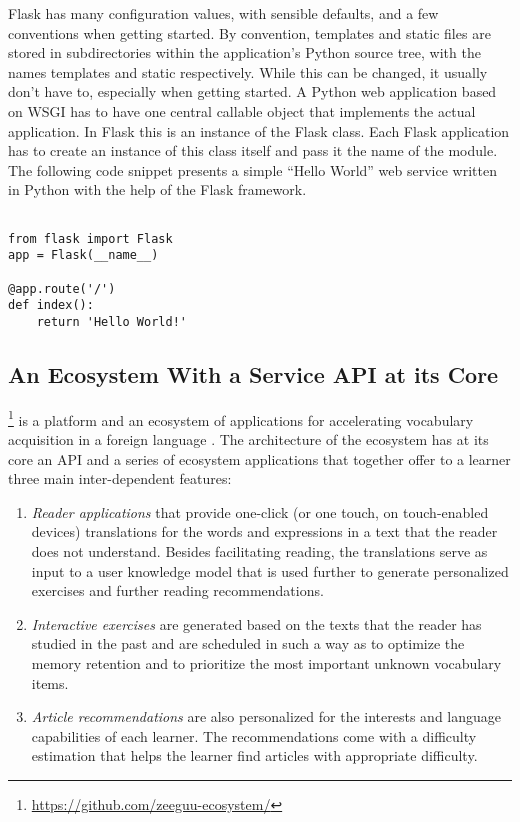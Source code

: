  Flask has many configuration values, with sensible defaults, and a few conventions when getting started. By convention, templates and static files are stored in subdirectories within the application's Python source tree, with the names templates and static respectively. While this can be changed, it usually don’t have to, especially when getting started.
%
 A Python web application based on WSGI has to have one central callable object that implements the actual application. In Flask this is an instance of the Flask class. Each Flask application has to create an instance of this class itself and pass it the name of the module. The following code snippet presents a simple ``Hello World'' web service written in Python with the help of the Flask framework. 

\begin{lstlisting}[style=custompython]

from flask import Flask
app = Flask(__name__)

@app.route('/')
def index():
    return 'Hello World!'

\end{lstlisting}





\subsection{An Ecosystem With a Service API at its Core}
\label{sec:api}
\label{sec:case}

  \zee\footnote{\url{https://github.com/zeeguu-ecosystem/}} is a platform and an ecosystem of applications for accelerating vocabulary acquisition in a foreign language \cite{Lungu16}. 
%
  The architecture of the ecosystem has at its core an API and a series of ecosystem applications that together offer to a learner three main inter-dependent features:

  \begin{enumerate}

    \item \textit{Reader applications} that provide one-click (or one touch, on touch-enabled devices) translations for the words and expressions in a text that the reader does not understand. Besides facilitating reading, the translations serve as input to a user knowledge model that is used further to generate personalized exercises and further reading recommendations.

    \item \textit{Interactive exercises} are generated based on the texts that the reader has studied in the past and are scheduled in such a way as to optimize the memory retention and to prioritize the most important unknown vocabulary items.

    \item \textit{Article recommendations} are also personalized for the interests and language capabilities of each learner. The recommendations come with a difficulty estimation that helps the learner find articles with appropriate difficulty.

  \end{enumerate}

